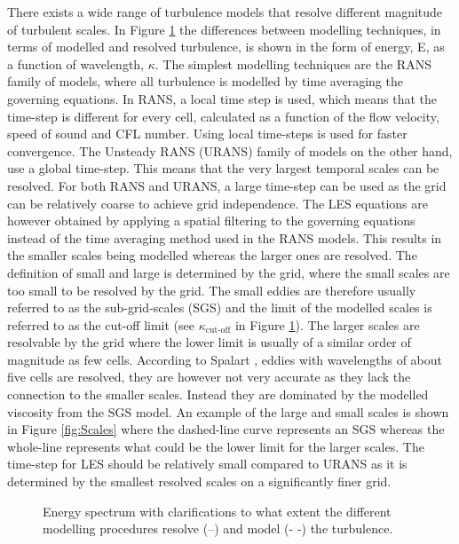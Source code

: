 There exists a wide range of turbulence models that resolve different magnitude of turbulent scales. In Figure \ref{fig:modelling} the differences between modelling techniques, in terms of modelled and resolved turbulence, is shown in the form of energy, E, as a function of wavelength, $\kappa$. The simplest modelling techniques are the RANS family of models, where all turbulence is modelled by time averaging the governing equations. In RANS, a local time step is used, which means that the time-step is different for every cell, calculated as a function of the flow velocity, speed of sound and CFL number. Using local time-steps is used for faster convergence. The Unsteady RANS (URANS) family of models on the other hand, use a global time-step. This means that the very largest temporal scales can be resolved. For both RANS and URANS, a large time-step can be used as the grid can be relatively coarse to achieve grid independence. The LES equations are however obtained by applying a spatial filtering to the governing equations instead of the time averaging method used in the RANS models. This results in the smaller scales being modelled whereas the larger ones are resolved. The definition of small and large is determined by the grid, where the small scales are too small to be resolved by the grid. The small eddies are therefore usually referred to as the sub-grid-scales (SGS) and the limit of the modelled scales is referred to as the cut-off limit (see $\kappa _\text{cut-off}$ in Figure \ref{fig:modelling}). The larger scales are resolvable by the grid where the lower limit is usually of a similar order of magnitude as few cells. According to Spalart \cite{YoungsPersonGuide}, eddies with wavelengths of about five cells are resolved, they are however not very accurate as they lack the connection to the smaller scales. Instead they are dominated by the modelled viscosity from the SGS model. An example of the large and small scales is shown in Figure \ref{fig:Scales} where the dashed-line curve represents an SGS whereas the whole-line represents what could be the lower limit for the larger scales. The time-step for LES should be relatively small compared to URANS as it is determined by the smallest resolved scales on a significantly finer grid. 
\begin{figure}[h]
   \centering

   \caption{Energy spectrum with clarifications to what extent the different modelling procedures resolve (--) and model ({\color{gray}- -}) the turbulence.}
  \label{fig:modelling}
\end{figure}

